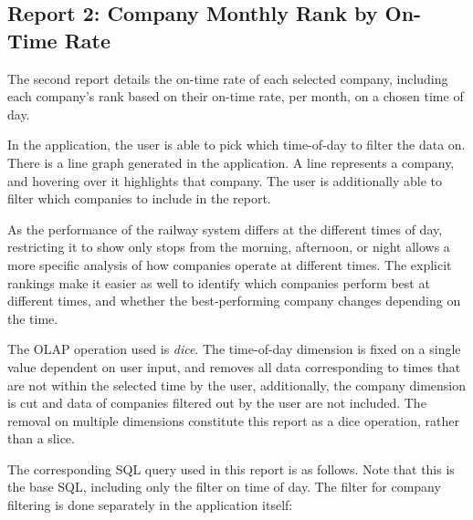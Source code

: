 \subsection{Report 2: Company Monthly Rank by On-Time Rate}
\label{subsubsec:company_monthly_rank_otr}
The second report details the on-time rate of each selected company, including each company's rank based on their on-time rate, per month, on a chosen time of day.

In the application, the user is able to pick which time-of-day to filter the data on. There is a line graph generated in the application. A line represents a company, and hovering over it highlights that company. The user is additionally able to filter which companies to include in the report.

As the performance of the railway system differs at the different times of day, restricting it to show only stops from the morning, afternoon, or night allows a more specific analysis of how companies operate at different times. The explicit rankings make it easier as well to identify which companies perform best at different times, and whether the best-performing company changes depending on the time.

The OLAP operation used is \emph{dice}. The time-of-day dimension is fixed on a single value dependent on user input, and removes all data corresponding to times that are not within the selected time by the user, additionally, the company dimension is cut and data of companies filtered out by the user are not included. The removal on multiple dimensions constitute this report as a dice operation, rather than a slice.

The corresponding SQL query used in this report is as follows. Note that this is the base SQL, including only the filter on time of day. The filter for company filtering is done separately in the application itself:

